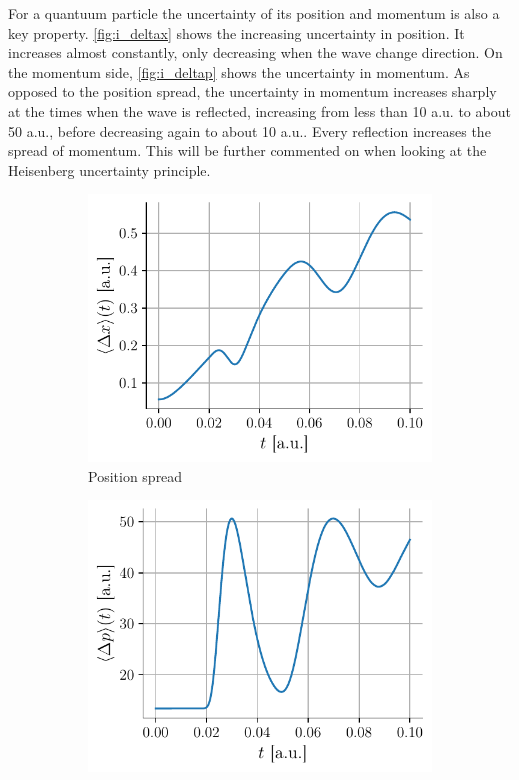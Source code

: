For a quantuum particle the uncertainty of its position and momentum is also a key property. \autoref{fig:i_deltax} shows the increasing uncertainty in position. It increases almost constantly, only decreasing when the wave change direction. On the momentum side, \autoref{fig:i_deltap} shows the uncertainty in momentum. As opposed to the position spread, the uncertainty in momentum increases sharply at the times when the wave is reflected, increasing from less than 10 a.u. to about 50 a.u., before decreasing again to about 10 a.u.. Every reflection increases the spread of momentum. This will be further commented on when looking at the Heisenberg uncertainty principle.

\begin{figure}[h]
    \centering
    \begin{subfigure}{0.48\linewidth}
        \centering
        \includegraphics[width=\linewidth]{figures/i_deltax.pdf}
        \caption{Position spread}
        \label{fig:i_deltax}
    \end{subfigure}
    \begin{subfigure}{0.48\linewidth}
        \centering
        \includegraphics[width=\linewidth]{figures/i_deltap.pdf}

\end{subfigure}
\end{figure}
